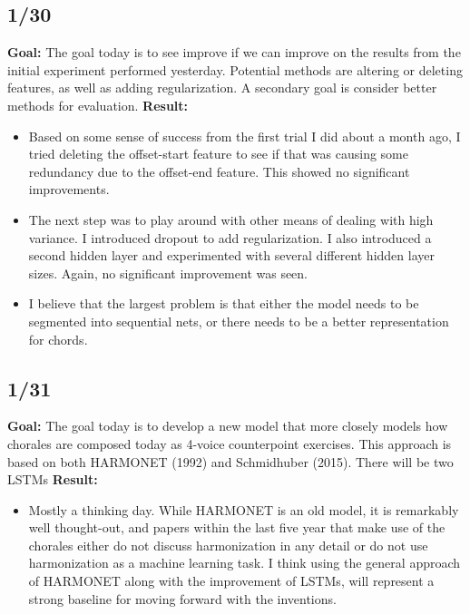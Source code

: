 \documentclass[12pt]{article}
\begin{document}
\subsection{1/30}
\textbf{Goal:} The goal today is to see improve if we can improve on the results from the initial experiment performed yesterday. Potential methods are altering or deleting features, as well as adding regularization. A secondary goal is consider better methods for evaluation.
\textbf{Result: }
\begin{itemize}
\item Based on some sense of success from the first trial I did about a month ago, I tried deleting the offset-start feature to see if that was causing some redundancy due to the offset-end feature. This showed no significant improvements.
\item The next step was to play around with other means of dealing with high variance. I introduced dropout to add regularization. I also introduced a second hidden layer and experimented with several different hidden layer sizes. Again, no significant improvement was seen.
\item I believe that the largest problem is that either the model needs to be segmented into sequential nets, or there needs to be a better representation for chords.
\end{itemize}

\subsection{1/31}
\textbf{Goal:} The goal today is to develop a new model that more closely models how chorales are composed today as 4-voice counterpoint exercises. This approach is based on both HARMONET (1992) and Schmidhuber (2015). There will be two LSTMs
\textbf{Result:} 
\begin{itemize}
\item Mostly a thinking day. While HARMONET is an old model, it is remarkably well thought-out, and papers within the last five year that make use of the chorales either do not discuss harmonization in any detail or do not use harmonization as a machine learning task. I think using the general approach of HARMONET along with the improvement of LSTMs, will represent a strong baseline for moving forward with the inventions.
\end{itemize}
\end{document}
